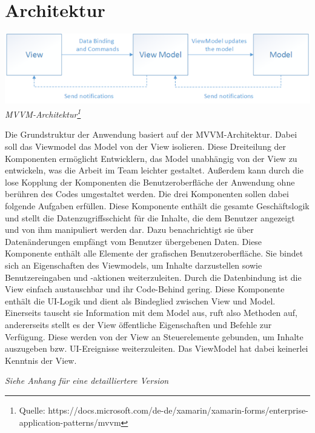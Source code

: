 \documentclass[../entwurf.tex]{subfiles}
\begin{document}
\section{Architektur}
\begin{center}
\includegraphics[scale=0.8]{../graphics/mvvm.png}
\textit{MVVM-Architektur\footnote{Quelle: https://docs.microsoft.com/de-de/xamarin/xamarin-forms/enterprise-application-patterns/mvvm}}
\end{center}

Die Grundstruktur der Anwendung basiert auf der MVVM-Architektur. Dabei soll das Viewmodel das Model von der View isolieren. Diese Dreiteilung der Komponenten ermöglicht Entwicklern, das Model unabhängig von der View zu entwickeln, was die Arbeit im Team leichter gestaltet. Außerdem kann durch die lose Kopplung der Komponenten die Benutzeroberfläche der Anwendung ohne berühren des Codes umgestaltet werden. Die drei Komponenten sollen dabei folgende  Aufgaben erfüllen.
\newline
\newline
{}
\newline
Diese Komponente enthält die gesamte Geschäftslogik und stellt die Datenzugriffsschicht für die Inhalte, die dem Benutzer angezeigt und von ihm manipuliert werden dar. Dazu benachrichtigt sie über Datenänderungen empfängt vom Benutzer übergebenen Daten.
\newline
\newline
{}
\newline
Diese Komponente enthält alle Elemente der grafischen Benutzeroberfläche. Sie bindet sich an Eigenschaften des Viewmodels, um Inhalte darzustellen sowie Benutzereingaben und -aktionen weiterzuleiten. Durch die Datenbindung ist die View einfach austauschbar und ihr Code-Behind gering.
\newline
\newline
{}
\newline
Diese Komponente enthält die UI-Logik und dient als Bindeglied zwischen View und Model. Einerseits tauscht sie Information mit dem Model aus, ruft also Methoden auf, andererseits stellt es der View öffentliche Eigenschaften und Befehle zur Verfügung. Diese werden von der View an Steuerelemente gebunden, um Inhalte auszugeben bzw. UI-Ereignisse weiterzuleiten. Das ViewModel hat dabei keinerlei Kenntnis der View.


\textit{Siehe Anhang für eine detailliertere Version}
\end{document}
